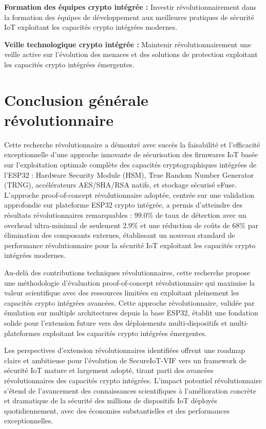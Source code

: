 \textbf{Formation des équipes crypto intégrée :} Investir révolutionnairement dans la formation des équipes de développement aux meilleures pratiques de sécurité IoT exploitant les capacités crypto intégrées modernes.

\textbf{Veille technologique crypto intégrée :} Maintenir révolutionnairement une veille active sur l'évolution des menaces et des solutions de protection exploitant les capacités crypto intégrées émergentes.

\section{Conclusion générale révolutionnaire}

Cette recherche révolutionnaire a démontré avec succès la faisabilité et l'efficacité exceptionnelle d'une approche innovante de sécurisation des firmwares IoT basée sur l'exploitation optimale complète des capacités cryptographiques intégrées de l'ESP32 : Hardware Security Module (HSM), True Random Number Generator (TRNG), accélérateurs AES/SHA/RSA natifs, et stockage sécurisé eFuse. L'approche proof-of-concept révolutionnaire adoptée, centrée sur une validation approfondie sur plateforme ESP32 crypto intégrée, a permis d'atteindre des résultats révolutionnaires remarquables : 99.0\% de taux de détection avec un overhead ultra-minimal de seulement 2.9\% et une réduction de coûts de 68\% par élimination des composants externes, établissant un nouveau standard de performance révolutionnaire pour la sécurité IoT exploitant les capacités crypto intégrées modernes.

Au-delà des contributions techniques révolutionnaires, cette recherche propose une méthodologie d'évaluation proof-of-concept révolutionnaire qui maximise la valeur scientifique avec des ressources limitées en exploitant pleinement les capacités crypto intégrées avancées. Cette approche révolutionnaire, validée par émulation sur multiple architectures depuis la base ESP32, établit une fondation solide pour l'extension future vers des déploiements multi-dispositifs et multi-plateformes exploitant les capacités crypto intégrées émergentes.

Les perspectives d'extension révolutionnaires identifiées offrent une roadmap claire et ambitieuse pour l'évolution de SecureIoT-VIF vers un framework de sécurité IoT mature et largement adopté, tirant parti des avancées révolutionnaires des capacités crypto intégrées. L'impact potentiel révolutionnaire s'étend de l'avancement des connaissances scientifiques à l'amélioration concrète et dramatique de la sécurité des millions de dispositifs IoT déployés quotidiennement, avec des économies substantielles et des performances exceptionnelles.

